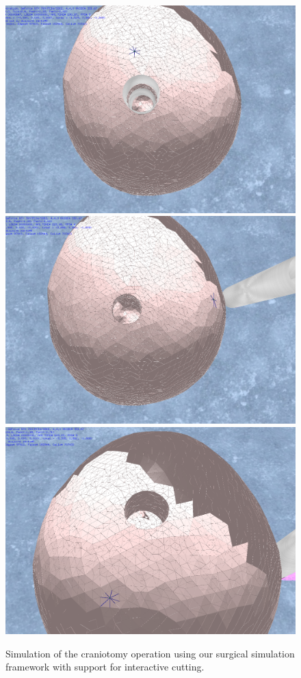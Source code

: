 \begin{figure}[H]
  \centering
  \includegraphics[width=0.5\linewidth]{figures/evaluation/craniotomy03.png}
  \includegraphics[width=0.5\linewidth]{figures/evaluation/craniotomy04.png}
  \includegraphics[width=0.5\linewidth]{figures/evaluation/craniotomy05.png}
  \caption{\label{fig:craniotomy}
  {Simulation of the craniotomy operation using our surgical simulation framework with support for interactive cutting.}
}
\end{figure}